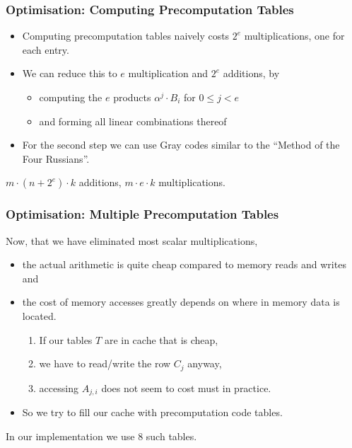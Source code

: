 \documentclass[11pt]{beamer}
\begin{document}
\begin{frame}
\frametitle{Optimisation: Computing Precomputation Tables}

\begin{itemize}
 \item Computing precomputation tables naively costs $2^e$ multiplications, one for each entry.
 \item We can reduce this to $e$ multiplication and $2^e$ additions, by 
  \begin{itemize}
    \item computing the $e$ products $\alpha^j \cdot B_i$ for $0 \leq j < e$
    \item and forming all linear combinations thereof
  \end{itemize}
  \item For the second step we can use Gray codes \cite{graycode} similar to the ``Method of the Four Russians''.
\end{itemize}

\begin{block}{}
$m\cdot (n + 2^e) \cdot k$ additions, $m \cdot e \cdot k$ multiplications.
\end{block}

\end{frame}

\begin{frame}
\frametitle{Optimisation: Multiple Precomputation Tables}

Now, that we have eliminated most scalar multiplications,

\begin{itemize}
 \item the actual arithmetic is quite cheap compared to memory reads and writes and
 \item the cost of memory accesses greatly depends on where in memory data is located.
 \begin{enumerate}
  \item If our tables $T$ are in cache that is cheap,
  \item we have to read/write the row $C_j$ anyway,
  \item accessing $A_{j,i}$ does not seem to cost must in practice.
 \end{enumerate}

 \item So we try to fill our cache with precomputation code tables.
\end{itemize}

\begin{block}{}
In our implementation we use 8 such tables.
\end{block}
\end{frame}
\end{document}
